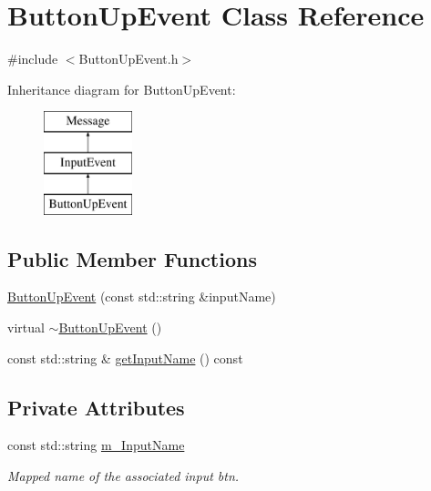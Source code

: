 \hypertarget{class_button_up_event}{}\section{Button\+Up\+Event Class Reference}
\label{class_button_up_event}


{\ttfamily \#include $<$Button\+Up\+Event.\+h$>$}

Inheritance diagram for Button\+Up\+Event\+:\begin{figure}[H]
\begin{center}
\leavevmode
\includegraphics[height=3.000000cm]{class_button_up_event}
\end{center}
\end{figure}
\subsection*{Public Member Functions}
\begin{DoxyCompactItemize}
\item 
\hyperlink{class_button_up_event_a4f17bfe1bc01e5f260e1fb98c50702d8}{Button\+Up\+Event} (const std\+::string \&input\+Name)
\item 
virtual \hyperlink{class_button_up_event_a3d60db80c7d6124f4281c045851f75e0}{$\sim$\+Button\+Up\+Event} ()
\item 
const std\+::string \& \hyperlink{class_button_up_event_a7e34b2f7f1d3e5f05abfe6487ec74137}{get\+Input\+Name} () const 
\end{DoxyCompactItemize}
\subsection*{Private Attributes}
\begin{DoxyCompactItemize}
\item 
const std\+::string \hyperlink{class_button_up_event_a10fa86bad63b034f0d68e11dd5233f22}{m\+\_\+\+Input\+Name}
\begin{DoxyCompactList}\small\item\em Mapped name of the associated input btn. \end{DoxyCompactList}\end{DoxyCompactItemize}


